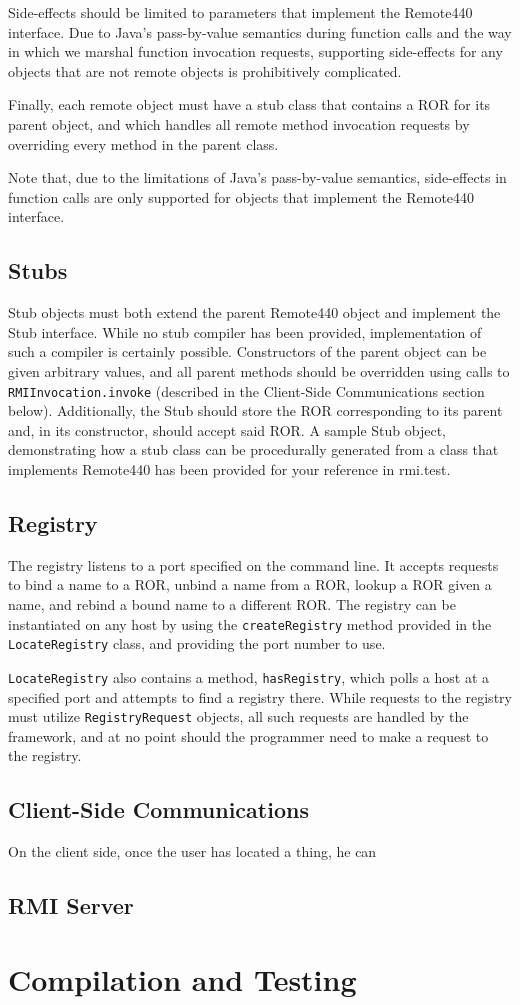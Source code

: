 \documentclass{scrartcl}
\begin{document}
Side-effects should be limited to parameters that implement the Remote440 interface.  Due to Java's pass-by-value semantics during function calls and the way in which we marshal function invocation requests, supporting side-effects for any objects that are not remote objects is prohibitively complicated.

Finally, each remote object must have a stub class that contains a ROR for its parent object, and which handles all remote method invocation requests by overriding every method in the parent class.

Note that, due to the limitations of Java's pass-by-value semantics, side-effects in function calls are only supported for objects that implement the Remote440 interface.

\subsection{Stubs}

Stub objects must both extend the parent Remote440 object and implement the Stub interface.  While no stub compiler has been provided, implementation of such a compiler is certainly possible.  Constructors of the parent object can be given arbitrary values, and all parent methods should be overridden using calls to \verb$RMIInvocation.invoke$ (described in the Client-Side Communications section below).  Additionally, the Stub should store the ROR corresponding to its parent and, in its constructor, should accept said ROR.  A sample Stub object, demonstrating how a stub class can be procedurally generated from a class that implements Remote440 has been provided for your reference in rmi.test.

\subsection{Registry}

The registry listens to a port specified on the command line.  It accepts requests to bind a name to a ROR, unbind a name from a ROR, lookup a ROR given a name, and rebind a bound name to a different ROR.  The registry can be instantiated on any host by using the \verb$createRegistry$ method provided in the \verb$LocateRegistry$ class, and providing the port number to use.

\verb$LocateRegistry$ also contains a method, \verb$hasRegistry$, which polls a host at a specified port and attempts to find a registry there.  While requests to the registry must utilize \verb$RegistryRequest$ objects, all such requests are handled by the framework, and at no point should the programmer need to make a request to the registry.

\subsection{Client-Side Communications}

On the client side, once the user has located a thing, he can 

\subsection{RMI Server}



\section{Compilation and Testing}
\end{document}
